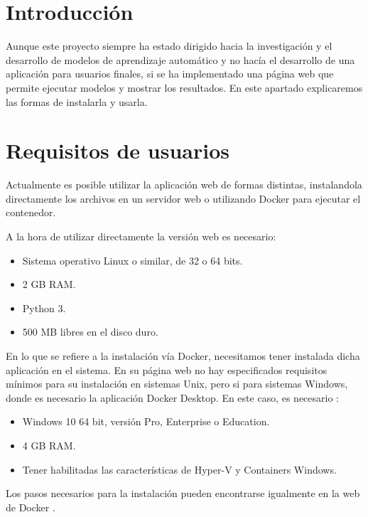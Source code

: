 
\section{Introducción}

Aunque este proyecto siempre ha estado dirigido hacia la investigación y el desarrollo de modelos de aprendizaje automático y no hacía el desarrollo de una aplicación para usuarios finales, si se ha implementado una página web que permite ejecutar modelos y mostrar los resultados. En este apartado explicaremos las formas de instalarla y usarla.

\section{Requisitos de usuarios}

Actualmente es posible utilizar la aplicación web de formas distintas, instalandola directamente los archivos en un servidor web o utilizando Docker para ejecutar el contenedor.

A la hora de utilizar directamente la versión web es necesario:

\begin{itemize}
    \item Sistema operativo Linux o similar, de 32 o 64 bits.
    \item 2 GB RAM.
    \item Python 3.
    \item 500 MB libres en el disco duro.
\end{itemize}

En lo que se refiere a la instalación vía Docker, necesitamos tener instalada dicha aplicación en el sistema. En su página web no hay especificados requisitos mínimos para su instalación en sistemas Unix, pero si para sistemas Windows, donde es necesario la aplicación Docker Desktop. En este caso, es necesario \cite{Docker-instalacion}:

\begin{itemize}
    \item Windows 10 64 bit, versión Pro, Enterprise o Education.
    \item 4 GB RAM.
    \item Tener habilitadas las características de Hyper-V y Containers Windows.
\end{itemize}

Los pasos necesarios para la instalación pueden encontrarse igualmente en la web de Docker \cite{Docker-instalacion}.

